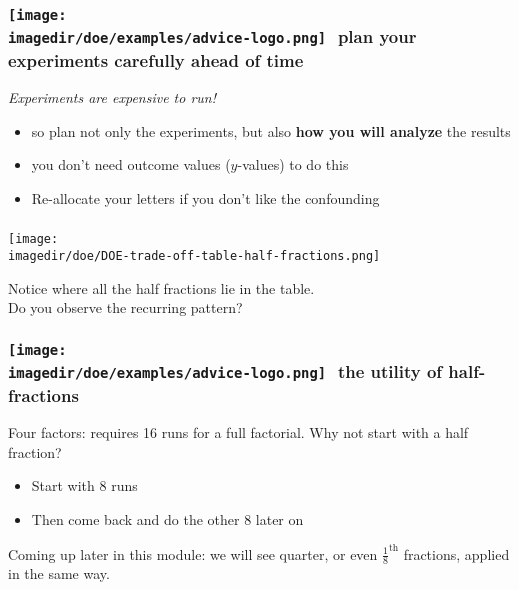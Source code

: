 \begin{frame}\frametitle{\texttt{[image: \\imagedir/doe/examples/advice-logo.png]}\,\, plan your experiments carefully ahead of time}
	
	\vspace{24pt}
	{\color{myOrange} 	\emph{Experiments are expensive to run!}}
	

	\begin{exampleblock}{}
		\vspace{12pt}
		\begin{itemize}
			\item	so plan not only the experiments, but also \textbf{how you will analyze} the results
			\item	you don't need outcome values ($y$-values) to do this
			
			\vspace{1cm}

			\item	Re-allocate your letters if you don't like the confounding
		\end{itemize} 
	\end{exampleblock}
	
\end{frame}

\begin{frame}\frametitle{}
	\texttt{[image: \\imagedir/doe/DOE-trade-off-table-half-fractions.png]}
	
	\vspace{-10pt}
	Notice where all the half fractions lie in the table. \\
	Do you observe the recurring pattern?
\end{frame}

\begin{frame}\frametitle{\texttt{[image: \\imagedir/doe/examples/advice-logo.png]}\,\, the utility of half-fractions}
	
	\vspace{24pt}
	Four factors: requires 16 runs for a full factorial. Why not start with a half fraction?
	
	\vspace{24pt}
	\begin{itemize}
		\item	Start with 8 runs
		\item	Then come back and do the other 8 later on
	\end{itemize}
	
	\pause
	\vspace{24pt}
	{\color{myOrange} Coming up later in this module: we will see quarter, or even $\tfrac{1}{8}^\text{th}$ fractions, applied in the same way.}
	
\end{frame}

